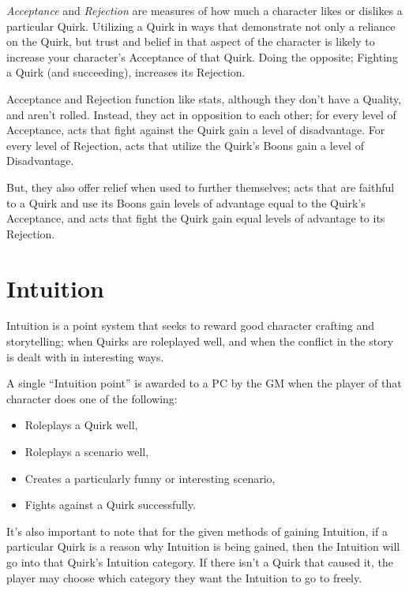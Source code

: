\documentclass[../main.tex]{subfiles}
\begin{document}
        \emph{Acceptance} and \emph{Rejection} are measures of how much a character likes or dislikes a particular Quirk. Utilizing a Quirk in ways that demonstrate not only a reliance on the Quirk, but trust and belief in that aspect of the character is likely to increase your character's Acceptance of that Quirk. Doing the opposite; Fighting a Quirk (and succeeding), increases its Rejection.
    
        Acceptance and Rejection function like stats, although they don't have a Quality, and aren't rolled. Instead, they act in opposition to each other; for every level of Acceptance, acts that fight against the Quirk gain a level of disadvantage. For every level of Rejection, acts that utilize the Quirk's Boons gain a level of Disadvantage.

        But, they also offer relief when used to further themselves; acts that are faithful to a Quirk and use its Boons gain levels of advantage equal to the Quirk's Acceptance, and acts that fight the Quirk gain equal levels of advantage to its Rejection.


    \section{Intuition}\label{intuition}

        Intuition is a point system that seeks to reward good character crafting and storytelling; when Quirks are roleplayed well, and when the conflict in the story is dealt with in interesting ways.

        A single ``Intuition point'' is awarded to a PC by the GM when the player of that character does one of the following:

    \begin{itemize}
        \item Roleplays a Quirk well,
        \item Roleplays a scenario well,
        \item Creates a particularly funny or interesting scenario,
        \item Fights against a Quirk successfully.
    \end{itemize}

        It's also important to note that for the given methods of gaining Intuition, if a particular Quirk is a reason why Intuition is being gained, then the Intuition will go into that Quirk's Intuition category. If there isn't a Quirk that caused it, the player may choose which category they want the Intuition to go to freely.
\end{document}
